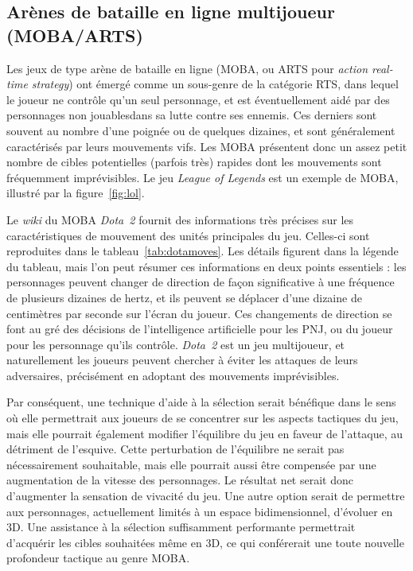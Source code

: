 	\subsection{Arènes de bataille en ligne multijoueur (MOBA/ARTS)}
	Les jeux de type arène de bataille en ligne (MOBA, ou ARTS pour \emph{action real-time strategy}) ont émergé comme un sous-genre de la catégorie RTS, dans lequel le joueur ne contrôle qu'un seul personnage, et est éventuellement aidé par des personnages non jouables\footnotemark dans sa lutte contre ses ennemis. Ces derniers sont souvent au nombre d'une poignée ou de quelques dizaines, et sont généralement caractérisés par leurs mouvements vifs. Les MOBA présentent donc un assez petit nombre de cibles potentielles (parfois très) rapides dont les mouvements sont fréquemment imprévisibles. Le jeu \emph{League of Legends} est un exemple de MOBA, illustré par la figure~\ref{fig:lol}.
	

	Le \emph{wiki} du MOBA \emph{Dota~2} fournit des informations très précises sur les caractéristiques de mouvement des unités principales du jeu\footnotemark. Celles-ci sont reproduites dans le tableau~\ref{tab:dotamoves}. Les détails figurent dans la légende du tableau, mais l'on peut résumer ces informations en deux points essentiels : les personnages peuvent changer de direction de façon significative à une fréquence de plusieurs dizaines de hertz, et ils peuvent se déplacer d'une dizaine de centimètres par seconde sur l'écran du joueur. Ces changements de direction se font au gré des décisions de l'intelligence artificielle pour les PNJ, ou du joueur pour les personnage qu'ils contrôle. \emph{Dota~2} est un jeu multijoueur, et naturellement les joueurs peuvent chercher à éviter les attaques de leurs adversaires, précisément en adoptant des mouvements imprévisibles.
	
	Par conséquent, une technique d'aide à la sélection serait bénéfique dans le sens où elle permettrait aux joueurs de se concentrer sur les aspects tactiques du jeu, mais elle pourrait également modifier l'équilibre du jeu en faveur de l'attaque, au détriment de l'esquive. Cette perturbation de l'équilibre ne serait pas nécessairement souhaitable, mais elle pourrait aussi être compensée par une augmentation de la vitesse des personnages. Le résultat net serait donc d'augmenter la sensation de vivacité du jeu. Une autre option serait de permettre aux personnages, actuellement limités à un espace bidimensionnel, d'évoluer en 3D. Une assistance à la sélection suffisamment performante permettrait d'acquérir les cibles souhaitées même en 3D, ce qui conférerait une toute nouvelle profondeur tactique au genre MOBA.
	
